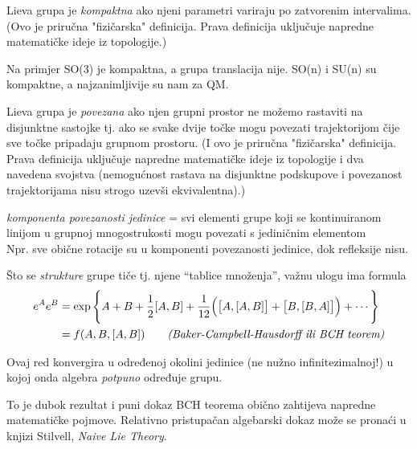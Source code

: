 \begin{definicija}[Kompaktnost]
Lieva grupa je \emph{kompaktna} ako njeni parametri variraju po zatvorenim intervalima.
(Ovo je priručna "fizičarska" definicija. Prava definicija uključuje napredne
matematičke ideje iz topologije.)
\label{def:kompaktnost}
\end{definicija}

Na primjer SO(3) je kompaktna, a grupa translacija nije. SO(n) i SU(n) su
 kompaktne, a najzanimljivije su nam za QM.

\begin{definicija}[Povezanost]
Lieva grupa je \emph{povezana} ako njen grupni prostor ne možemo
rastaviti na disjunktne sastojke tj. ako se svake dvije točke 
mogu povezati trajektorijom čije sve točke pripadaju grupnom prostoru.
(I ovo je priručna "fizičarska" definicija. Prava definicija uključuje napredne
matematičke ideje iz topologije i dva navedena svojstva (nemogućnost rastava
na disjunktne podskupove i povezanost trajektorijama nisu strogo uzevši
ekvivalentna).)
\label{def:povezanost}
\end{definicija}


\emph{komponenta povezanosti jedinice} = svi elementi grupe koji se
kontinuiranom linijom u grupnoj mnogostrukosti mogu povezati s
jediničnim elementom\\
 Npr. sve obične rotacije su u komponenti povezanosti
jedinice, dok refleksije nisu.


Što se \emph{strukture} grupe tiče tj. njene ``tablice množenja'', važnu
ulogu ima formula
\begin{equation}
\begin{split}
  e^A e^B &= \exp\Bigg\{A+B+\frac{1}{2}[A,B]+\frac{1}{12}\Big(\big[A,[A,B]\big]+
 \big[B,[B,A]\big]\Big)+\cdots \Bigg\} \\
          &= f(A,B,[A,B]) \qquad \text{\emph{(Baker-Campbell-Hausdorff ili BCH teorem)}}
\end{split}
\end{equation}

Ovaj red konvergira u određenoj okolini jedinice (ne nužno infinitezimalnoj!)
u kojoj onda algebra \emph{potpuno} određuje grupu.

To je dubok rezultat i puni dokaz BCH teorema obično zahtijeva napredne matematičke
pojmove. Relativno pristupačan algebarski dokaz može se pronaći u knjizi
Stilvell, \emph{Naive Lie Theory}.

